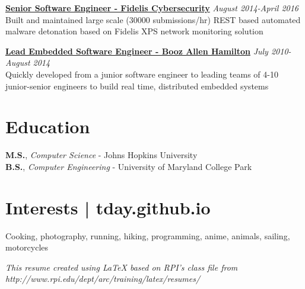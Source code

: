 \documentclass[line]{res}
\begin{document}
\begin{resume}
{\bf \underline{Senior Software Engineer - Fidelis Cybersecurity}} \hfill {\sl August 2014-April 2016}\\[2pt]
Built and maintained large scale (30000 submissions/hr) REST based automated malware detonation based on Fidelis XPS network monitoring solution

{\bf \underline{Lead Embedded Software Engineer - Booz Allen Hamilton}} \hfill {\sl July 2010-August 2014}\\[2pt]
Quickly developed from a junior software engineer to leading teams of 4-10 junior-senior engineers to build real time, distributed embedded systems

\vspace{0.1in}
\section{{Education}} 
\vspace{1pt} 
{\bf M.S.}, {\sl Computer Science}  - Johns Hopkins University \\
{\bf B.S.}, {\sl Computer Engineering} - University of Maryland College Park
 
\vspace{0.1in}
\section{{Interests | tday.github.io}} 
\vspace{-5pt} 
\begin{center}
Cooking, photography, running, hiking, programming, anime,  animals, sailing, motorcycles

\vspace{.05in}
{\tiny {\sl This resume created using LaTeX based on RPI's class file from http://www.rpi.edu/dept/arc/training/latex/resumes/}}
\end{center} 
 
\end{resume} 
\end{document}
